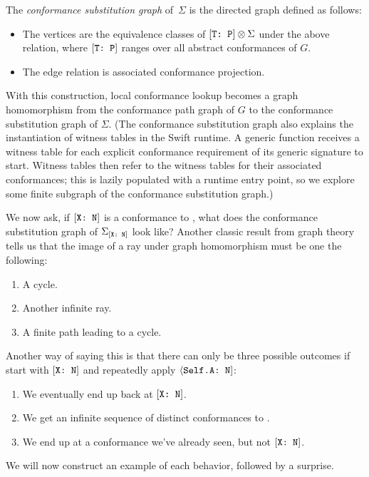 \documentclass[../generics]{subfiles}
\begin{document}
\begin{definition}
The \emph{conformance substitution graph} of~$\Sigma$ is the directed graph defined as follows:
\begin{itemize}
\item The vertices are the equivalence classes of $[\texttt{T:~P}]\otimes\Sigma$ under the above relation, where $[\texttt{T:~P}]$ ranges over all abstract conformances of $G$.
\item The edge relation is associated conformance projection.
\end{itemize}

With this construction, local conformance lookup becomes a graph homomorphism from the conformance path graph of $G$ to the conformance substitution graph of $\Sigma$. (The conformance substitution graph also explains the instantiation of witness tables in the Swift runtime. A generic function receives a witness table for each explicit conformance requirement of its generic signature to start. Witness tables then refer to the witness tables for their associated conformances; this is lazily populated with a runtime entry point, so we explore some finite subgraph of the conformance substitution graph.)
\end{definition}

We now ask, if $[\texttt{X:~N}]$ is a conformance to \tN, what does the conformance substitution graph of $\Sigma_{[\texttt{X:~N}]}$ look like? Another classic result from graph theory tells us that the image of a ray under graph homomorphism must be one the following:
\begin{enumerate}
\item A cycle.
\item Another infinite ray.
\item A finite path leading to a cycle.
\end{enumerate}
Another way of saying this is that there can only be three possible outcomes if start with $[\texttt{X:~N}]$ and repeatedly apply $\langle\texttt{Self.A:~N}]$:
\begin{enumerate}
\item We eventually end up back at $[\texttt{X:~N}]$.
\item We get an infinite sequence of distinct conformances to \tN.
\item We end up at a conformance we've already seen, but not $[\texttt{X:~N}]$.
\end{enumerate}
We will now construct an example of each behavior, followed by a surprise.
\end{document}
